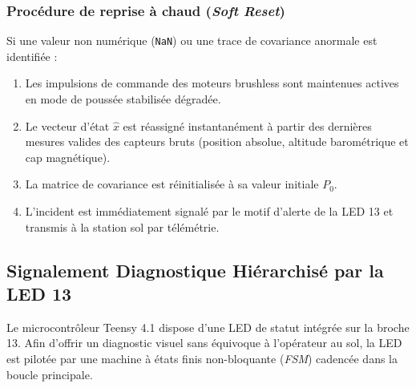 \documentclass[../Implementation.tex]{subfiles}
\begin{document}
\subsubsection{Procédure de reprise à chaud (\textit{Soft Reset})}
Si une valeur non numérique (\lstinline|NaN|) ou une trace de covariance anormale est identifiée :
\begin{enumerate}
    \item Les impulsions de commande des moteurs brushless sont maintenues actives en mode de poussée stabilisée dégradée.
    \item Le vecteur d'état $\hat{x}$ est réassigné instantanément à partir des dernières mesures valides des capteurs bruts (position absolue, altitude barométrique et cap magnétique).
    \item La matrice de covariance est réinitialisée à sa valeur initiale $P_0$.
    \item L'incident est immédiatement signalé par le motif d'alerte de la LED 13 et transmis à la station sol par télémétrie.
\end{enumerate}

\subsection{Signalement Diagnostique Hiérarchisé par la LED 13}

Le microcontrôleur Teensy 4.1 dispose d'une LED de statut intégrée sur la broche 13. Afin d'offrir un diagnostic visuel sans équivoque à l'opérateur au sol, la LED est pilotée par une machine à états finis non-bloquante (\textit{FSM}) cadencée dans la boucle principale.
\end{document}
